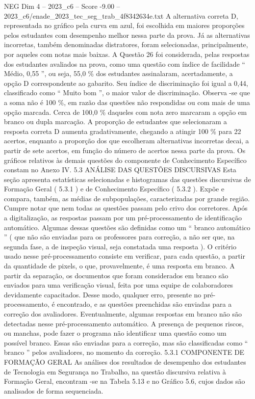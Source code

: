 \begin{textsample}{NEG Dim 4 – 2023\_c6 – Score -9.00 – 2023\_c6/enade\_2023\_tec\_seg\_trab\_4f8342634e.txt}
A alternativa correta D, representada no gráfico pela curva em azul, foi escolhida em maiores proporções pelos estudantes com desempenho melhor nessa parte da prova.
Já as alternativas incorretas, também denominadas distratores, foram selecionadas, principalmente, por aqueles com notas mais baixas.
A Questão 26 foi considerada, pelas respostas dos estudantes avaliados na prova, como uma questão com índice de facilidade “ Médio, 0,55 ”, ou seja, 55,0 \% dos estudantes assinalaram, acertadamente, a opção D correspondente ao gabarito.
Seu índice de discriminação foi igual a 0,44, classificado como “ Muito bom ”, o maior valor de discriminação.
Observa -se que a soma não é 100 \%, em razão das questões não respondidas ou com mais de uma opção marcada.
Cerca de 100,0 \% daqueles com nota zero marcaram a opção em branco ou dupla marcação.
A proporção de estudantes que selecionaram a resposta correta D aumenta gradativamente, chegando a atingir 100 \% para 22 acertos, enquanto a proporção dos que escolheram alternativas incorretas decai, a partir de sete acertos, em função do número de acertos nessa parte da prova.
Os gráficos relativos às demais questões do componente de Conhecimento Específico constam no Anexo IV. 5.3 ANÁLISE DAS QUESTÕES DISCURSIVAS Esta seção apresenta estatísticas selecionadas e histogramas das questões discursivas de Formação Geral ( 5.3.1 ) e de Conhecimento Específico ( 5.3.2 ).
Expõe e compara, também, as médias de subpopulações, caracterizadas por grande região.
Cumpre notar que nem todas as questões passam pelo crivo dos corretores.
Após a digitalização, as respostas passam por um pré-processamento de identificação automático.
Algumas dessas questões são definidas como um “ branco automático ” ( que não são enviadas para os professores para correção, a não ser que, na segunda fase, a de inspeção visual, seja constatada uma resposta ).
O critério usado nesse pré-processamento consiste em verificar, para cada questão, a partir da quantidade de pixels, o que, provavelmente, é uma resposta em branco.
A partir da separação, os documentos que foram considerados em branco são enviados para uma verificação visual, feita por uma equipe de colaboradores devidamente capacitados.
Desse modo, qualquer erro, presente no pré-processamento, é encontrado, e as questões preenchidas são enviadas para a correção dos avaliadores.
Eventualmente, algumas respostas em branco não são detectadas nesse pré-processamento automático.
A presença de pequenos riscos, ou manchas, pode fazer o programa não identificar uma questão como um possível branco.
Essas são enviadas para a correção, mas são classificadas como “ branco ” pelos avaliadores, no momento da correção. 5.3.1 COMPONENTE DE FORMAÇÃO GERAL As análises dos resultados de desempenho dos estudantes de Tecnologia em Segurança no Trabalho, na questão discursiva relativa à Formação Geral, encontram -se na Tabela 5.13 e no Gráfico 5.6, cujos dados são analisados de forma sequenciada.

\end{textsample}
